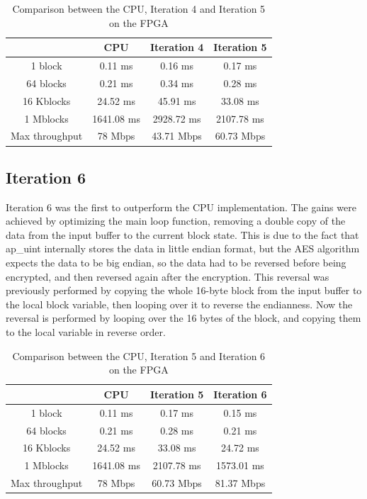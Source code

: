\documentclass[12pt,oneside,a4paper]{article}
\begin{document}
\begin{table}[h!]
	\centering
	\begin{tabular}{cccc}
		\toprule
		 & CPU & Iteration 4 & Iteration 5 \\
		\midrule
		1 block & 0.11 ms & 0.16 ms & 0.17 ms \\
		64 blocks & 0.21 ms & 0.34 ms & 0.28 ms \\
		16 Kblocks & 24.52 ms & 45.91 ms & 33.08 ms \\
		1 Mblocks & 1641.08 ms & 2928.72 ms & 2107.78 ms \\
		Max throughput & 78 Mbps & 43.71 Mbps & 60.73 Mbps \\
		\bottomrule
	\end{tabular}
	\caption{Comparison between the CPU, Iteration 4 and Iteration 5 on the FPGA}
\end{table}

\subsection{Iteration 6} \label{subsec:iter6}
Iteration 6 was the first to outperform the CPU implementation. The gains were achieved by optimizing the main loop function, removing a double copy of the data from the input buffer to the current block state.
This is due to the fact that ap\_uint internally stores the data in little endian format, but the AES algorithm expects the data to be big endian, so the data had to be reversed before being encrypted, and then reversed again after the encryption.
This reversal was previously performed by copying the whole 16-byte block from the input buffer to the local block variable, then looping over it to reverse the endianness.
Now the reversal is performed by looping over the 16 bytes of the block, and copying them to the local variable in reverse order.

\begin{table}[h!]
	\centering
	\begin{tabular}{cccc}
		\toprule
		 & CPU & Iteration 5 & Iteration 6 \\
		\midrule
		1 block & 0.11 ms & 0.17 ms & 0.15 ms \\
		64 blocks & 0.21 ms & 0.28 ms & 0.21 ms \\
		16 Kblocks & 24.52 ms & 33.08 ms & 24.72 ms \\
		1 Mblocks & 1641.08 ms & 2107.78 ms & 1573.01 ms \\
		Max throughput & 78 Mbps & 60.73 Mbps & 81.37 Mbps \\
		\bottomrule
	\end{tabular}
	\caption{Comparison between the CPU, Iteration 5 and Iteration 6 on the FPGA}
\end{table}
\end{document}
